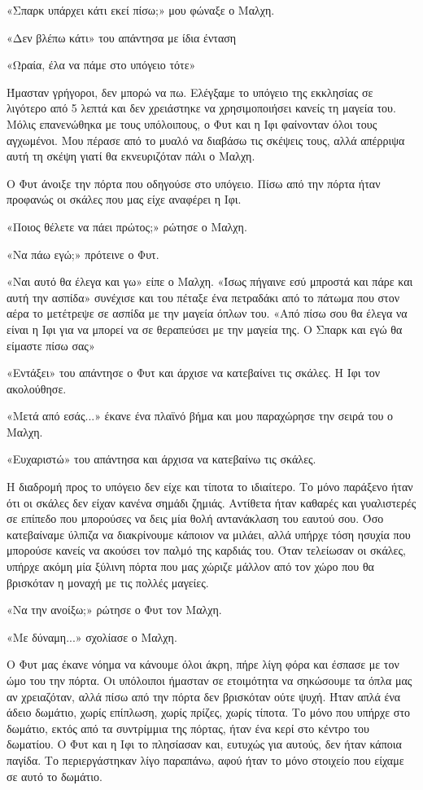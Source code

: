 \documentclass[12pt,twoside, openany]{book}
\begin{document}
«Σπαρκ υπάρχει κάτι εκεί πίσω;» μου φώναξε ο Μαλχη.

«Δεν βλέπω κάτι» του απάντησα με ίδια ένταση

«Ωραία, έλα να πάμε στο υπόγειο τότε»

Ήμασταν γρήγοροι, δεν μπορώ να πω. Ελέγξαμε το υπόγειο της εκκλησίας σε λιγότερο από 5 λεπτά και δεν χρειάστηκε να χρησιμοποιήσει κανείς τη μαγεία του. Μόλις επανενώθηκα με τους υπόλοιπους, ο Φυτ και η Ιφι φαίνονταν όλοι τους αγχωμένοι. Μου πέρασε από το μυαλό να διαβάσω τις σκέψεις τους, αλλά απέρριψα αυτή τη σκέψη γιατί θα εκνευριζόταν πάλι ο Μαλχη.

Ο Φυτ άνοιξε την πόρτα που οδηγούσε στο υπόγειο. Πίσω από την πόρτα ήταν προφανώς οι σκάλες που μας είχε αναφέρει η Ιφι.

«Ποιος θέλετε να πάει πρώτος;» ρώτησε ο Μαλχη.

«Να πάω εγώ;» πρότεινε ο Φυτ.

«Ναι αυτό θα έλεγα και γω» είπε ο Μαλχη. «Ίσως πήγαινε εσύ μπροστά και πάρε και αυτή την ασπίδα» συνέχισε και του πέταξε ένα πετραδάκι από το πάτωμα που στον αέρα το μετέτρεψε σε ασπίδα με την μαγεία όπλων του. «Από πίσω σου θα έλεγα να είναι η Ιφι για να μπορεί να σε θεραπεύσει με την μαγεία της. Ο Σπαρκ και εγώ θα είμαστε πίσω σας»

«Εντάξει» του απάντησε ο Φυτ και άρχισε να κατεβαίνει τις σκάλες. Η Ιφι τον ακολούθησε.

«Μετά από εσάς...» έκανε ένα πλαϊνό βήμα και μου παραχώρησε την σειρά του ο Μαλχη.

«Ευχαριστώ» του απάντησα και άρχισα να κατεβαίνω τις σκάλες.

Η διαδρομή προς το υπόγειο δεν είχε και τίποτα το ιδιαίτερο. Το μόνο παράξενο ήταν ότι οι σκάλες δεν είχαν κανένα σημάδι ζημιάς. Αντίθετα ήταν καθαρές και γυαλιστερές σε επίπεδο που μπορούσες να δεις μία θολή αντανάκλαση του εαυτού σου. Όσο κατεβαίναμε ύλπιζα να διακρίνουμε κάποιον να μιλάει, αλλά υπήρχε τόση ησυχία που μπορούσε κανείς να ακούσει τον παλμό της καρδιάς του. Όταν τελείωσαν οι σκάλες, υπήρχε ακόμη μία ξύλινη πόρτα που μας χώριζε μάλλον από τον χώρο που θα βρισκόταν η μοναχή με τις πολλές μαγείες.

«Να την ανοίξω;» ρώτησε ο Φυτ τον Μαλχη.

«Με δύναμη...» σχολίασε ο Μαλχη.

Ο Φυτ μας έκανε νόημα να κάνουμε όλοι άκρη, πήρε λίγη φόρα και έσπασε με τον ώμο του την πόρτα. Οι υπόλοιποι ήμασταν σε ετοιμότητα να σηκώσουμε τα όπλα μας αν χρειαζόταν, αλλά πίσω από την πόρτα δεν βρισκόταν ούτε ψυχή. Ήταν απλά ένα άδειο δωμάτιο, χωρίς επίπλωση, χωρίς πρίζες, χωρίς τίποτα. Το μόνο που υπήρχε στο δωμάτιο, εκτός από τα συντρίμμια της πόρτας, ήταν ένα κερί στο κέντρο του δωματίου. Ο Φυτ και η Ιφι το πλησίασαν και, ευτυχώς για αυτούς, δεν ήταν κάποια παγίδα. Το περιεργάστηκαν λίγο παραπάνω, αφού ήταν το μόνο στοιχείο που είχαμε σε αυτό το δωμάτιο.
\end{document}
